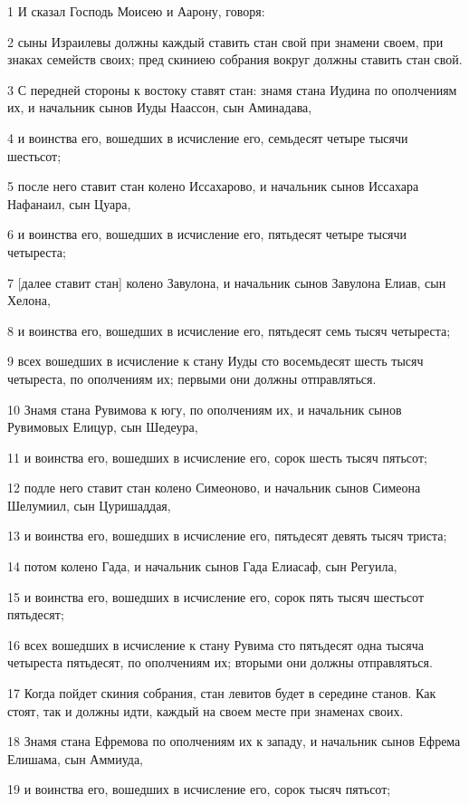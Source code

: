 \par 1 И сказал Господь Моисею и Аарону, говоря:
\par 2 сыны Израилевы должны каждый ставить стан свой при знамени своем, при знаках семейств своих; пред скиниею собрания вокруг должны ставить стан свой.
\par 3 С передней стороны к востоку ставят стан: знамя стана Иудина по ополчениям их, и начальник сынов Иуды Наассон, сын Аминадава,
\par 4 и воинства его, вошедших в исчисление его, семьдесят четыре тысячи шестьсот;
\par 5 после него ставит стан колено Иссахарово, и начальник сынов Иссахара Нафанаил, сын Цуара,
\par 6 и воинства его, вошедших в исчисление его, пятьдесят четыре тысячи четыреста;
\par 7 [далее ставит стан] колено Завулона, и начальник сынов Завулона Елиав, сын Хелона,
\par 8 и воинства его, вошедших в исчисление его, пятьдесят семь тысяч четыреста;
\par 9 всех вошедших в исчисление к стану Иуды сто восемьдесят шесть тысяч четыреста, по ополчениям их; первыми они должны отправляться.
\par 10 Знамя стана Рувимова к югу, по ополчениям их, и начальник сынов Рувимовых Елицур, сын Шедеура,
\par 11 и воинства его, вошедших в исчисление его, сорок шесть тысяч пятьсот;
\par 12 подле него ставит стан колено Симеоново, и начальник сынов Симеона Шелумиил, сын Цуришаддая,
\par 13 и воинства его, вошедших в исчисление его, пятьдесят девять тысяч триста;
\par 14 потом колено Гада, и начальник сынов Гада Елиасаф, сын Регуила,
\par 15 и воинства его, вошедших в исчисление его, сорок пять тысяч шестьсот пятьдесят;
\par 16 всех вошедших в исчисление к стану Рувима сто пятьдесят одна тысяча четыреста пятьдесят, по ополчениям их; вторыми они должны отправляться.
\par 17 Когда пойдет скиния собрания, стан левитов будет в середине станов. Как стоят, так и должны идти, каждый на своем месте при знаменах своих.
\par 18 Знамя стана Ефремова по ополчениям их к западу, и начальник сынов Ефрема Елишама, сын Аммиуда,
\par 19 и воинства его, вошедших в исчисление его, сорок тысяч пятьсот;

